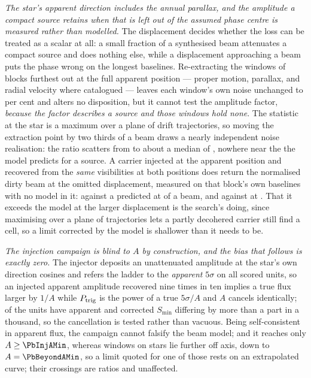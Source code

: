 \emph{The star's apparent direction includes the annual parallax, and the
amplitude a compact source retains when that is left out of the assumed phase
centre is measured rather than modelled.} The displacement decides whether the
loss can be treated as a scalar at all: a small fraction of a synthesised beam
attenuates a compact source and does nothing else, while a displacement
approaching a beam puts the phase wrong on the longest baselines. Re-extracting
the \SensNReextWin{} windows of \SensNReextBlock{} blocks furthest out at the
full apparent position --- proper motion, parallax, and radial velocity where
catalogued --- leaves each window's own noise unchanged to
\SensReextNoiseMaxPct{} per cent and alters no disposition, but it cannot test
the amplitude factor, \emph{because the factor describes a source and those
windows hold none}. The statistic at the star is a maximum over a plane of
drift trajectories, so moving the extraction point by two thirds of a beam
draws a nearly independent noise realisation: the ratio scatters from
\SensReTstarLo{} to \SensReTstarHi{} about a median of \SensReTstarMed,
nowhere near the \SensPxLargePred{} the model predicts for a source. A
carrier injected at the apparent position and recovered from the \emph{same}
visibilities at both positions does return the normalised dirty beam at the
omitted displacement, measured on that block's own baselines with no model in
it: \SensPxSmallMeas{} against a predicted \SensPxSmallPred{} at
\SensPxSmallBeams{} of a beam, and \SensPxLargeMeas{} against
\SensPxLargePred{} at \SensPxLargeBeams. That it exceeds the model at the
larger displacement is the search's doing, since maximising over a plane of
trajectories lets a partly decohered carrier still find a cell, so a limit
corrected by the model is shallower than it needs to be.

\emph{The injection campaign is blind to $A$ by construction, and the bias
that follows is exactly zero.} The injector deposits an unattenuated amplitude
at the star's own direction cosines and refers the ladder to the
\emph{apparent} $5\sigma$ on all \PbInjNUnit{} scored units, so an injected
apparent amplitude recovered nine times in ten implies a true flux larger by
$1/A$ while $P_{\rm trig}$ is the power of a true $5\sigma/A$ and $A$ cancels
identically; \PbInjNDistinct{} of the units have apparent and corrected
$S_{\min}$ differing by more than a part in a thousand, so the cancellation
is tested rather than vacuous. Being self-consistent in apparent flux, the
campaign cannot falsify the beam model; and it reaches only
$A\ge\PbInjAMin$, whereas \PbNBeyond{} windows on \PbNBeyondStar{} stars lie
further off axis, down to $A=\PbBeyondAMin$, so a limit quoted for one of
those rests on an extrapolated curve; their \PbNBeyondCross{} crossings are
ratios and unaffected.

